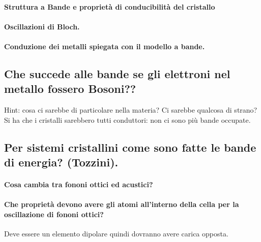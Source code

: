 \paragraph{Struttura a Bande e proprietà di conducibilità del cristallo}%
\paragraph{Oscillazioni di Bloch.}%
\label{par:Oscillazioni di Bloch.}
\paragraph{Conduzione dei metalli spiegata con il modello a bande.}%
\label{par:Conduzione dei metalli spiegata con il modello a bande.}
\subsection{Che succede alle bande se gli elettroni nel metallo fossero Bosoni??}%
\label{sub:Che succede alle bande se gli elettroni nel metallo fossero Bosoni??}
Hint: cosa ci sarebbe di particolare nella materia? Ci sarebbe qualcosa di strano? Si ha che i cristalli sarebbero tutti conduttori: non ci sono più bande occupate.
\subsection{Per sistemi cristallini come sono fatte le bande di energia? (Tozzini).}%
\paragraph{Cosa cambia tra fononi ottici ed acustici?}%
\paragraph{Che proprietà devono avere gli atomi all'interno della cella per la oscillazione di fononi ottici?}%
Deve essere un elemento dipolare quindi dovranno avere carica opposta.

